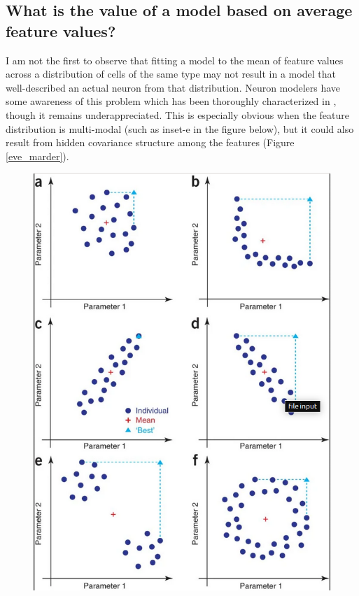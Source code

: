 \subsection{What is the value of a model based on average feature values?}
I am not the first to observe that fitting a model to the mean of feature values across a distribution of cells of the same type may not result in a model that well-described an actual neuron from that distribution.
Neuron modelers have some awareness of this problem which has been thoroughly characterized in \cite{marder2011multiple}, though it remains underappreciated.
This is especially obvious when the feature distribution is multi-modal (such as inset-e in the figure below), but it could also result from hidden covariance structure among the features (Figure \ref{eve_marder}).

\begin{figure}
\begin{center}

\includegraphics[scale=0.65]{figures/eve_marder.png}
\end{center}

\end{figure}
\label{fig:eve_marder}

